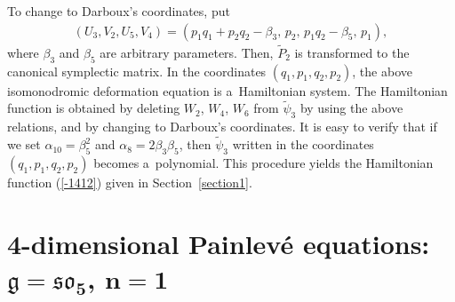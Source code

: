 \documentclass[pdftex]{sigma}
\numberwithin{equation}{section}
\begin{document}
To change to Darboux's coordinates, put
\begin{gather*}
(U_3, V_2 ,U_5, V_4) = (p_1q_1 + p_2q_2 - \beta_3,\, p_2,\, p_1q_2-\beta_5,\, p_1),
\end{gather*}
where $\beta_3$ and $\beta_5$ are arbitrary parameters. Then, $\widetilde{P}_2$ is transformed to the canonical symplectic matrix. In the coordinates $(q_1, p_1, q_2, p_2)$, the above isomonodromic deformation equation is a~Hamiltonian system. The Hamiltonian function is obtained by deleting $W_2$, $W_4$, $W_6$ from $\widetilde{\psi}_3$ by using the above relations, and by changing to Darboux's coordinates. It is easy to verify that if we set $\alpha _{10}=\beta_5^2$ and $\alpha _8 = 2\beta_3 \beta_5$, then $\widetilde{\psi}_3$ written in the coordinates $(q_1, p_1,q_2,p_2)$ becomes a~polynomial. This procedure yields the Hamiltonian function (\ref{-1412}) given in Section~\ref{section1}.

\section[4-dimensional Painlev\'{e} equations: $\mathfrak{g} = \mathfrak{so}_5$, $n=1$]{4-dimensional Painlev\'{e} equations: $\boldsymbol{\mathfrak{g} = \mathfrak{so}_5}$, $\boldsymbol{n=1}$}\label{section5}
\end{document}
